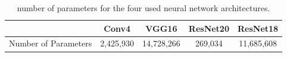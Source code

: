 \begin{table}[ht!]
    \centering
    \begin{tabular}{lcccc}
      \cline{2-5}
                           & \textbf{Conv4} & \textbf{VGG16} & \textbf{ResNet20} & \textbf{ResNet18} \\ \hline
      Number of Parameters & 2,425,930      & 14,728,266     & 269,034           & 11,685,608        \\ \hline
    \end{tabular}
    \caption{ number of parameters for the four used neural network architectures.}
    \label{tab:intro:networks_size}
\end{table}